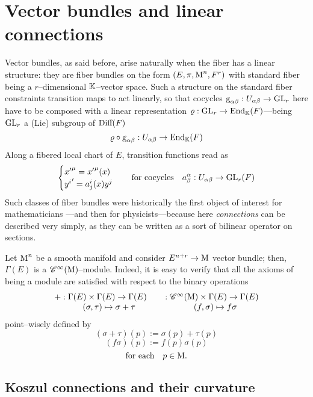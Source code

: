 \section{Vector bundles and linear connections}
Vector bundles, as said before, arise naturally when the fiber has a linear structure: they are fiber bundles on the form $(E,\pi,\text{\normalfont M}^n,F^r)$ with standard fiber being a $r$--dimensional $\mathbb{K}$--vector space. Such a structure on the standard fiber constraints transition maps to act linearly, so that cocycles $\text{\normalfont g}_{\alpha\beta}:U_{\alpha\beta}\to\text{\normalfont GL}_r$ here have to be composed with a linear representation $\varrho:\text{\normalfont GL}_r\to\text{\normalfont End}_{\mathbb{K}}(F)$---being $\text{\normalfont GL}_r$ a (Lie) subgroup of $\text{\normalfont Diff}(F)$
$$\varrho\circ\text{\normalfont g}_{\alpha\beta}:U_{\alpha\beta}\to\text{\normalfont End}_{\mathbb{K}}(F)$$
Along a fibered local chart of $E$, transition functions read as
$$\begin{cases}
    {x'}^\mu={x'}^\mu(x)\\
    {y^i}'=a^i_j(x)y^j
\end{cases}\quad\text{for cocycles}\quad a^\alpha_\beta:U_{\alpha\beta}\to\text{\normalfont GL}_r(F)$$
Such classes of fiber bundles were historically the first object of interest for mathematicians ---and then for physicists---because here \emph{connections} can be described very simply, as they can be written as a sort of bilinear operator on sections.

\begin{remark}
    Let $\text{\normalfont M}^n$ be a smooth manifold and consider $E^{n+r}\to\text{\normalfont M}$ vector bundle; then, $\Gamma(E)$ is a $\mathscr{C}^\infty(\text{\normalfont M})$--module.
    Indeed, it is easy to verify that all the axioms of being a module are satisfied with respect to the binary operations
    $$\begin{matrix}
    +:\Gamma(E)\times\Gamma(E)\to\Gamma(E)\\   \qquad(\sigma,\tau)\mapsto\sigma+\tau
    \end{matrix}\qquad\begin{matrix}
    \,:\mathscr{C}^\infty(\text{\normalfont M})\times\Gamma(E)\to\Gamma(E)\\
    \quad(f,\sigma)\mapsto f\sigma
    \end{matrix}$$
    point--wisely defined by 
    $$(\sigma+\tau)(p):=\sigma(p)+\tau(p)$$
    $$(f\sigma)(p):=f(p)\sigma(p)$$
    $$\text{for each}\quad p\in\text{\normalfont M}.$$
\end{remark}

\subsection{Koszul connections and their curvature}

